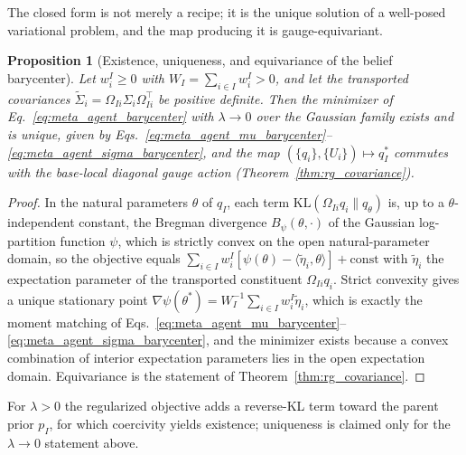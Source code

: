 \documentclass[11pt]{article}
\newtheorem{proposition}{Proposition}
\begin{document}
The closed form is not merely a recipe; it is the unique solution of a well-posed variational problem, and the map producing it is gauge-equivariant.

\begin{proposition}[Existence, uniqueness, and equivariance of the belief barycenter]
\label{prop:barycenter_existence}
Let $w_i^I \ge 0$ with $W_I = \sum_{i \in I} w_i^I > 0$, and let the transported covariances $\tilde{\Sigma}_i = \Omega_{Ii}\Sigma_i\Omega_{Ii}^\top$ be positive definite. Then the minimizer of Eq.~\eqref{eq:meta_agent_barycenter} with $\lambda \to 0$ over the Gaussian family exists and is unique, given by Eqs.~\eqref{eq:meta_agent_mu_barycenter}--\eqref{eq:meta_agent_sigma_barycenter}, and the map $(\{q_i\}, \{U_i\}) \mapsto q_I^*$ commutes with the base-local diagonal gauge action (Theorem~\ref{thm:rg_covariance}).
\end{proposition}

\begin{proof}
In the natural parameters $\theta$ of $q_I$, each term $\mathrm{KL}(\Omega_{Ii}q_i \| q_\theta)$ is, up to a $\theta$-independent constant, the Bregman divergence $B_\psi(\theta, \cdot)$ of the Gaussian log-partition function $\psi$, which is strictly convex on the open natural-parameter domain, so the objective equals $\sum_{i \in I} w_i^I[\psi(\theta) - \langle \tilde{\eta}_i, \theta\rangle] + \mathrm{const}$ with $\tilde{\eta}_i$ the expectation parameter of the transported constituent $\Omega_{Ii}q_i$. Strict convexity gives a unique stationary point $\nabla\psi(\theta^*) = W_I^{-1}\sum_{i \in I} w_i^I \tilde{\eta}_i$, which is exactly the moment matching of Eqs.~\eqref{eq:meta_agent_mu_barycenter}--\eqref{eq:meta_agent_sigma_barycenter}, and the minimizer exists because a convex combination of interior expectation parameters lies in the open expectation domain. Equivariance is the statement of Theorem~\ref{thm:rg_covariance}.
\end{proof}

For $\lambda > 0$ the regularized objective adds a reverse-KL term toward the parent prior $p_I$, for which coercivity yields existence; uniqueness is claimed only for the $\lambda \to 0$ statement above.
\end{document}
